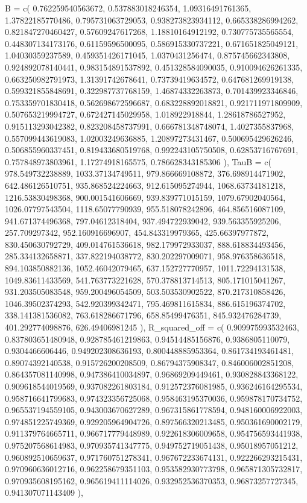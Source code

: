 \documentclass[
  letterpaper,
  DIV=11]{scrartcl}
\newenvironment{Shaded}{\begin{snugshade}}{\end{snugshade}}
\newcommand{\NormalTok}[1]{\textcolor[rgb]{0.00,0.23,0.31}{#1}}
\begin{document}
\begin{Shaded}
\begin{Highlighting}[]
\NormalTok{  \textasciigrave{}B\textasciigrave{} = c( 0.762259540563672, 0.537883018246354, 1.09316491761365, 1.37822185770486, 0.795731063729053, 0.938273823934112, 0.665338286994262, 0.821847270460427, 0.57609247617268, 1.18810164912192, 0.730775735565554, 0.448307134173176, 0.61159596500095, 0.586915330737221, 0.671651825049121, 1.04030359237589, 0.459351426171045, 1.0370431256474, 0.875745662343808, 0.924892078140441, 0.983154891537892, 0.451328584090035, 0.910094626261335, 0.663250982791973, 1.31391742678641, 0.73739419634572, 0.647681269919138, 0.599321855848691, 0.322987737768159, 1.46874332263873, 0.701439923346846, 0.753359701830418, 0.562698672596687, 0.683228892018821, 0.921711971809909, 0.507653219994727, 0.672427145029958, 1.018922918844, 1.28618786527952, 0.915113293042382, 0.823208458737991, 0.666781348748074, 1.4027355837968, 0.557099443619083, 1.02003249636885, 1.20897273431467, 0.500695429626246, 0.506855960337451, 0.819433680519768, 0.992243105750508, 0.62853716767691, 0.757848973803961, 1.17274918165575, 0.786628343185306 ),}
\NormalTok{  \textasciigrave{}TauB\textasciigrave{} = c( 978.549732238889, 1033.37134749511, 979.866669108872, 376.698914471902, 642.486126510751, 935.868524224663, 912.615095274944, 1068.63734181218, 1216.53830498368, 900.001541606669, 939.839771015159, 1079.67902040564, 1026.07797543504, 1118.65077790939, 955.518078242896, 464.856516087109, 941.671374496368, 797.04612318404, 937.494722939042, 939.563355925206, 257.709297342, 952.160916696907, 454.843319979365, 425.66397977872, 830.450630792729, 409.014761536618, 982.179972933037, 888.618834493456, 285.334132658871, 337.822194038772, 830.202297009071, 958.976358636518, 894.103850882136, 1052.46042079465, 637.152727770957, 1011.72294131538, 1049.83611433569, 541.763773221628, 570.378813714513, 805.171015041267, 931.203505083548, 959.200496054509, 503.503530902522, 870.217310858426, 1046.39502374293, 542.920399342471, 795.469811615834, 886.615196374702, 338.141381536082, 763.618286671796, 658.85499476351, 845.932476284739, 401.292774098876, 626.49406981245 ),}
\NormalTok{  \textasciigrave{}R\_squared\_off\textasciigrave{} = c( 0.909975993532463, 0.837803651480948, 0.928785461219863, 0.94514485156876, 0.9386805110079, 0.9304466606446, 0.949202308636193, 0.800448885953364, 0.861734193461481, 0.89074392140538, 0.915726200208509, 0.86794375908347, 0.846006002851208, 0.864357081140998, 0.947386410034897, 0.96869209449461, 0.930828843368122, 0.909618544019569, 0.937082261803184, 0.912572376081985, 0.936246164295534, 0.958716641799683, 0.974323356725068, 0.958463195370036, 0.959878170734752, 0.965537194559105, 0.943003670627289, 0.967315861778594, 0.948160006922003, 0.974851225749369, 0.929205964904726, 0.897566320213485, 0.950361690002179, 0.911379764665711, 0.966717779448989, 0.922618306009658, 0.954756593441938, 0.975207568614983, 0.970935741347775, 0.949752719051438, 0.95018957051212, 0.960892510659637, 0.971760751278341, 0.967672233674131, 0.922266293215431, 0.970960636012716, 0.962258679351103, 0.953582930773798, 0.965871305732817, 0.970935608195162, 0.965619411114026, 0.932952536370353, 0.96873257727345, 0.941307071143409 ),}

\end{Highlighting}
\end{Shaded}
\end{document}
